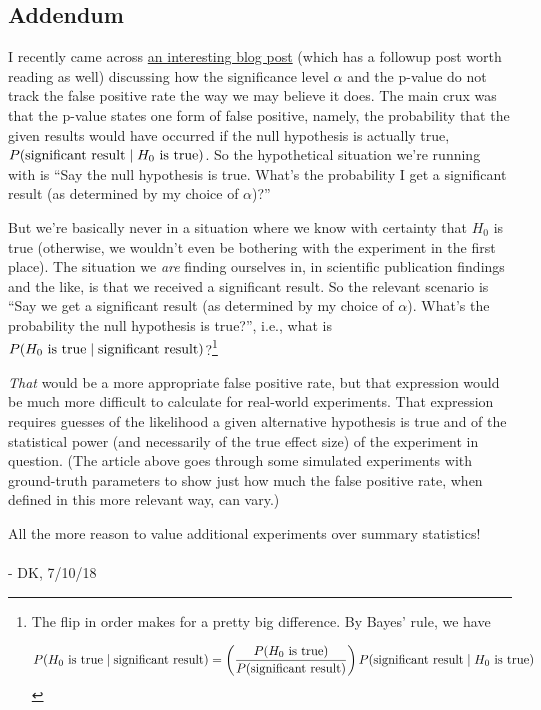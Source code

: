 \documentclass[../main/main.tex]{subfiles}
\begin{document}
\subsection*{Addendum}

I recently came across \href{https://lucklab.ucdavis.edu/blog/2018/4/19/why-i-lost-faith-in-p-values}{an interesting blog post} (which has a followup post worth reading as well) discussing
how the significance level \(\alpha\) and the p-value do not
track the false positive rate the way we may believe it does.
The main crux was that the p-value states one form of
false positive, namely, the probability
that the given results would have occurred if the null hypothesis
is actually true,
\(P(\text{significant result} \mid H_0 \text{ is true})\).
So the hypothetical situation we're running with is
``Say the null hypothesis is true. What's the probability I get
a significant result (as determined by my choice of \(\alpha\))?''\par

But we're basically never in a situation 
where we know with certainty that \(H_0\) is true 
(otherwise, we wouldn't even be bothering with the experiment
in the first place).
The situation we \emph{are} finding ourselves in, in scientific
publication findings and the like, is that we received a 
significant result. So the relevant scenario is 
``Say we get a significant result (as determined by my choice of \(\alpha\)).
What's the probability the null hypothesis is true?'', i.e., what is
\(P(H_0 \text{ is true} \mid \text{significant result})\)?\footnote{
The flip in order makes for a pretty big difference. 
By Bayes' rule, we have

\[
  P(H_0 \text{ is true} \mid \text{significant result}) =
\left(\frac{P(H_0 \text{ is true})}{P(\text{significant result})}\right)
P(\text{significant result} \mid H_0 \text{ is true}) \]
}

\emph{That} would be a more appropriate false positive rate,
but that expression would be much more difficult to calculate
for real-world experiments. That expression requires guesses of
the likelihood a given alternative hypothesis is true and
of the statistical power (and necessarily of the true effect size)
of the experiment in question.
(The article above goes through some simulated experiments
with ground-truth parameters to show just how much
the false positive rate, when defined in this more relevant way,
can vary.)\par

All the more reason to value additional experiments over
summary statistics!
\\
\\
- DK, 7/10/18
\end{document}
